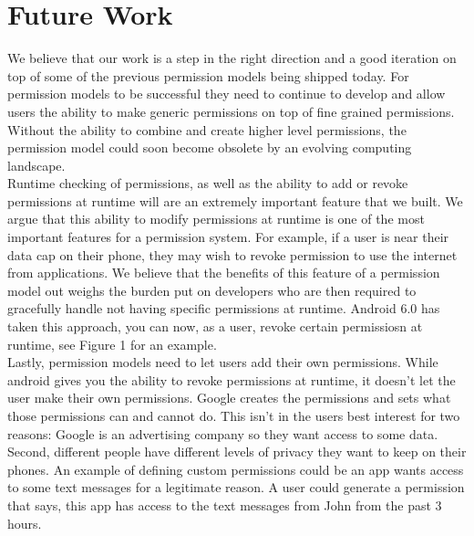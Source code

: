 \section{Future Work}\label{section:futurework}
We believe that our work is a step in the right direction and a good iteration on top of some of the previous permission models being shipped today. For permission models to be successful they need to continue to develop and allow users the ability to make generic permissions on top of fine grained permissions. Without the ability to combine and create higher level permissions, the permission model could soon become obsolete by an evolving computing landscape.\\
\indent
Runtime checking of permissions, as well as the ability to add or revoke permissions at runtime will are an extremely important feature that we built. We argue that this ability to modify permissions at runtime is one of the most important features for a permission system. For example, if a user is near their data cap on their phone, they may wish to revoke permission to use the internet from applications. We believe that the benefits of this feature of a permission model out weighs the burden put on developers who are then required to gracefully handle not having specific permissions at runtime. Android 6.0 has taken this approach, you can now, as a user, revoke certain permissiosn at runtime, see Figure 1 for an example.\\
\indent
Lastly, permission models need to let users add their own permissions. While android gives you the ability to revoke permissions at runtime, it doesn't let the user make their own permissions. Google creates the permissions and sets what those permissions can and cannot do. This isn't in the users best interest for two reasons: Google is an advertising company so they want access to some data. Second, different people have different levels of privacy they want to keep on their phones. An example of defining custom permissions could be an app wants access to some text messages for a legitimate reason. A user could generate a permission that says, this app has access to the text messages from John from the past 3 hours.\\



